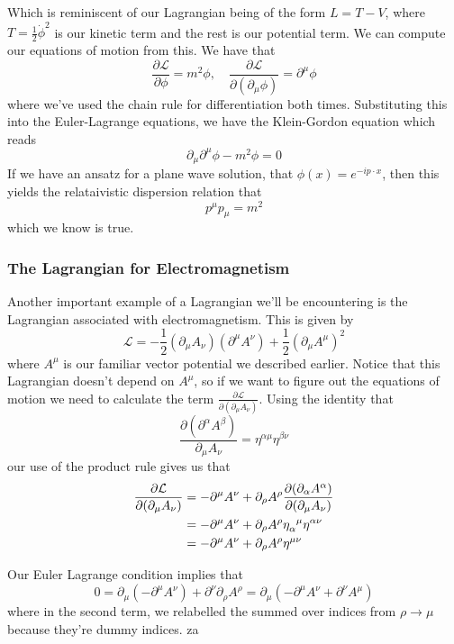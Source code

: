 \documentclass[11pt, oneside]{article}   	%
\theoremstyle{newline}
\theoremstyle{newline}
\theoremstyle{newline}
\theoremstyle{newline}
\theoremstyle{newline}
\begin{document}
Which is reminiscent of our Lagrangian being of the form $L = T - V$, where $T = \frac{1}{ 2} \dot{ \phi}^2 $ is our kinetic term and the rest is our potential term. We can compute our equations of motion from this. We have that 
\[ 
\frac{ \partial \mathcal{L} }{ \partial \phi} = m^2  \phi, \quad \frac{ \partial \mathcal{ L }}{ \partial ( \partial_\mu \phi ) }  = \partial^\mu \phi 
\] 
where we've used the chain rule for differentiation both times. Substituting this into the Euler-Lagrange equations, we have the Klein-Gordon equation which reads 
\[
\partial_\mu \partial^\mu \phi  - m^2 \phi  = 0 
\]
If we have an ansatz for a plane wave solution, that $\phi(x)  = e^{ - i p \cdot x}$, then this yields the relataivistic dispersion relation that 
\[
p^\mu p_\mu = m^2 
\] 
which we know is true.

\subsubsection{The Lagrangian for Electromagnetism} 
Another important example of a Lagrangian we'll be encountering is the Lagrangian associated with electromagnetism. This is given by 
\[ 
\mathcal{L}  =  - \frac{1}{2} ( \partial_\mu A_\nu)( \partial^\mu A^\nu )   + \frac{1}{ 2} ( \partial_\mu A^\mu)^2 
\] 
where $A^\mu$ is our familiar vector potential we described earlier. Notice that this Lagrangian doesn't depend on $A^\mu$, so if we want to figure out the equations of motion we need to calculate the term $ \frac{ \partial \mathcal{L} } {\partial (\partial_\mu A_\nu) } $. Using the identity that 
\[ 
\frac{ \partial (\partial^\alpha A^\beta) }{ \partial_\mu A_\nu } = \eta^{ \alpha \mu} \eta^{ \beta \nu } 
\] our use of the product rule gives us that 
\begin{align*} 
\frac{ \partial \mathcal{L}}{\partial ( \partial_\mu A_\nu ) } & = - \partial^\mu A^\nu + \partial_\rho A^\rho \frac{ \partial ( \partial_\alpha A^\alpha ) }{ \partial ( \partial_\mu A_\nu ) }   \\
&=  -\partial^\mu A^\nu + \partial_\rho A^\rho \eta\indices{_\alpha^\mu} \eta\indices{^\alpha^\nu} \\
&=  -\partial^\mu A^\nu + \partial_\rho A^\rho \eta^{ \mu \nu } 
\end{align*} 

Our Euler Lagrange condition implies that 
\[ 
0 = \partial_\mu (  - \partial^\mu A^\nu)  + \partial^\nu \partial_\rho A^\rho = \partial_\mu (  - \partial^\mu A^\nu + \partial ^\nu A^\mu ) 
\] 
where in the second term, we relabelled the summed over indices from $\rho \rightarrow \mu$ because they're dummy indices.  
za
\end{document}
